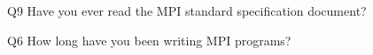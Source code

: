 \begin{description}%
\item{Q9} Have you ever read the MPI standard specification document?%
\item{Q6} How long have you been writing MPI programs?%
\end{description}%
